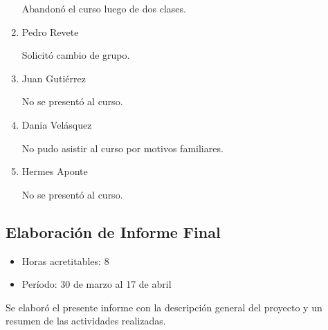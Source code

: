 \begin{enumerate}
                    Abandonó el curso luego de dos clases.
                    
                    \item Pedro Revete
                    
                    Solicitó cambio de grupo.
                    
                    \item Juan Gutiérrez
                    
                    No se presentó al curso.
                    
                    \item Dania Velásquez
                    
                    No pudo asistir al curso por motivos familiares.
                    
                    \item Hermes Aponte
                    
                    No se presentó al curso.
                    
                \end{enumerate}
                
             \subsection {Elaboración de Informe Final}
             \begin{itemize}
                 \item Horas acretitables: 8
                 \item Período: 30 de marzo al 17 de abril
                \end{itemize}
                
                Se elaboró el presente informe con la descripción general del proyecto y un resumen de las actividades realizadas.

	\pagebreak
	
